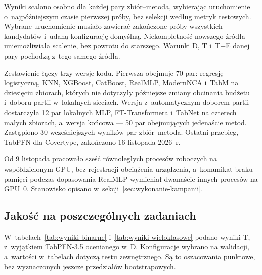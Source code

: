 Wyniki scalono osobno dla każdej pary zbiór--metoda, wybierając uruchomienie o~najpóźniejszym czasie pierwszej próby, bez selekcji według metryk testowych. Wybrane uruchomienie musiało zawierać zakończone próby wszystkich kandydatów i~udaną konfigurację domyślną. Niekompletność nowszego źródła uniemożliwiała scalenie, bez powrotu do starszego. Warunki D, T i~T+E danej pary pochodzą z~tego samego źródła.

Zestawienie łączy trzy wersje kodu. Pierwsza obejmuje 70 par: regresję logistyczną, KNN, XGBoost, CatBoost, RealMLP, ModernNCA i~TabM na dziesięciu zbiorach, których nie dotyczyły późniejsze zmiany obcinania budżetu i~doboru partii w~lokalnych sieciach. Wersja z~automatycznym doborem partii dostarczyła 12 par lokalnych MLP, FT-Transformera i~TabNet na czterech małych zbiorach, a~wersja końcowa --- 50 par obejmujących jedenaście metod. Zastąpiono 30 wcześniejszych wyników par zbiór--metoda. Ostatni przebieg, TabPFN dla Covertype, zakończono 16 listopada 2026~r.

Od 9 listopada pracowało sześć równoległych procesów roboczych na współdzielonym GPU, bez rejestracji obciążenia urządzenia, a~komunikat braku pamięci podczas dopasowania RealMLP wymieniał dwanaście innych procesów na GPU~0. Stanowisko opisano w~sekcji~\ref{sec:wykonanie-kampanii}.

\subsection{Jakość na poszczególnych zadaniach}
\label{sec:wyniki-zadania}

W~tabelach~\ref{tab:wyniki-binarne} i~\ref{tab:wyniki-wieloklasowe} podano wyniki T, z~wyjątkiem TabPFN-3.5 ocenianego w~D. Konfiguracje wybrano na walidacji, a~wartości w~tabelach dotyczą testu zewnętrznego. Są to oszacowania punktowe, bez wyznaczonych jeszcze przedziałów bootstrapowych.

